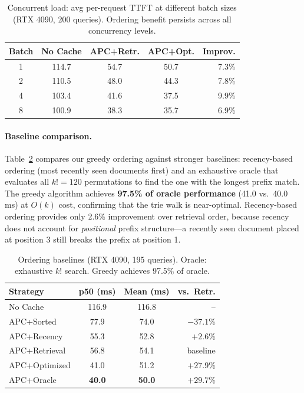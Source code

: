 \documentclass{article}
\begin{document}
\begin{table}[t]
\caption{Concurrent load: avg per-request TTFT at different batch sizes (RTX 4090, 200 queries). Ordering benefit persists across all concurrency levels.}
\label{tab:concurrent}
\centering
\small
\begin{tabular}{@{}ccccr@{}}
\toprule
\textbf{Batch} & \textbf{No Cache} & \textbf{APC+Retr.} & \textbf{APC+Opt.} & \textbf{Improv.} \\
\midrule
1 & 114.7 & 54.7 & 50.7 & 7.3\% \\
2 & 110.5 & 48.0 & 44.3 & 7.8\% \\
4 & 103.4 & 41.6 & 37.5 & 9.9\% \\
8 & 100.9 & 38.3 & 35.7 & 6.9\% \\
\bottomrule
\end{tabular}
\vspace{-0.5em}
\end{table}

\paragraph{Baseline comparison.}
Table~\ref{tab:baselines} compares our greedy ordering against stronger baselines: recency-based ordering (most recently seen documents first) and an exhaustive oracle that evaluates all $k!{=}120$ permutations to find the one with the longest prefix match. The greedy algorithm achieves \textbf{97.5\% of oracle performance} (41.0 vs.\ 40.0\,ms) at $O(k)$ cost, confirming that the trie walk is near-optimal. Recency-based ordering provides only 2.6\% improvement over retrieval order, because recency does not account for \emph{positional} prefix structure---a recently seen document placed at position 3 still breaks the prefix at position 1.

\begin{table}[t]
\caption{Ordering baselines (RTX 4090, 195 queries). Oracle: exhaustive $k!$ search. Greedy achieves 97.5\% of oracle.}
\label{tab:baselines}
\centering
\small
\begin{tabular}{@{}lccr@{}}
\toprule
\textbf{Strategy} & \textbf{p50 (ms)} & \textbf{Mean (ms)} & \textbf{vs.\ Retr.} \\
\midrule
No Cache & 116.9 & 116.8 & -- \\
APC+Sorted & 77.9 & 74.0 & $-37.1$\% \\
APC+Recency & 55.3 & 52.8 & $+2.6$\% \\
APC+Retrieval & 56.8 & 54.1 & baseline \\
APC+Optimized & 41.0 & 51.2 & $+27.9$\% \\
APC+Oracle & \textbf{40.0} & \textbf{50.0} & $+29.7$\% \\
\bottomrule
\end{tabular}
\vspace{-0.5em}
\end{table}
\end{document}
